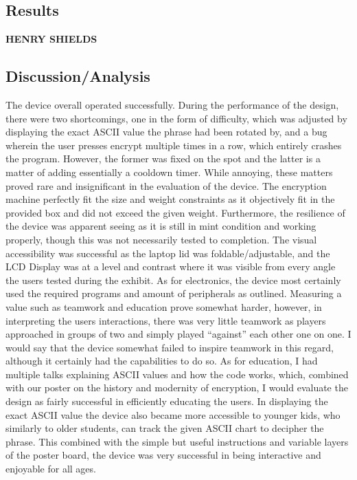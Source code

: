 \documentclass[conference]{IEEEtran}
\begin{document}
\subsection{Results}

\lipsum[41-43]

\newpage


\vspace{10pt} \LARGE \textbf{HENRY SHIELDS} \normalsize

\subsection{Discussion/Analysis}

\par The device overall operated successfully. During the performance of the design, there were two shortcomings, one in the form of difficulty, which was adjusted by displaying the exact ASCII value the phrase had been rotated by, and a bug wherein the user presses encrypt multiple times in a row, which entirely crashes the program. However, the former was fixed on the spot and the latter is a matter of adding essentially a cooldown timer. While annoying, these matters proved rare and insignificant in the evaluation of the device. The encryption machine perfectly fit the size and weight constraints as it objectively fit in the provided box and did not exceed the given weight. Furthermore, the resilience of the device was apparent seeing as it is still in mint condition and working properly, though this was not necessarily tested to completion. The visual accessibility was successful as the laptop lid was foldable/adjustable, and the LCD Display was at a level and contrast where it was visible from every angle the users tested during the exhibit. As for electronics, the device most certainly used the required programs and amount of peripherals as outlined. Measuring a value such as teamwork and education prove somewhat harder, however, in interpreting the users interactions, there was very little teamwork as players approached in groups of two and simply played “against” each other one on one. I would say that the device somewhat failed to inspire teamwork in this regard, although it certainly had the capabilities to do so. As for education, I had multiple talks explaining ASCII values and how the code works, which, combined with our poster on the history and modernity of encryption, I would evaluate the design as fairly successful in efficiently educating the users. In displaying the exact ASCII value the device also became more accessible to younger kids, who similarly to older students, can track the given ASCII chart to decipher the phrase. This combined with the simple but useful instructions and variable layers of the poster board, the device was very successful in being interactive and enjoyable for all ages.
\end{document}
